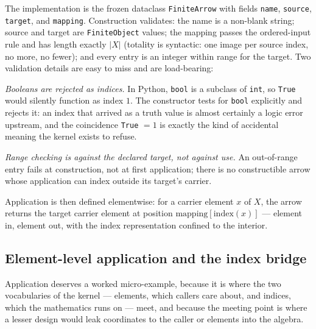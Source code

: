 The implementation is the frozen dataclass \texttt{FiniteArrow} with
fields \texttt{name}, \texttt{source}, \texttt{target}, and
\texttt{mapping}. Construction validates: the name is a non-blank string;
source and target are \texttt{FiniteObject} values; the mapping passes the
ordered-input rule and has length exactly $|X|$ (totality is syntactic:
one image per source index, no more, no fewer); and every entry is an
integer within range for the target. Two validation details are easy to
miss and are load-bearing:

\emph{Booleans are rejected as indices.} In Python, \texttt{bool} is a
subclass of \texttt{int}, so \texttt{True} would silently function as
index $1$. The constructor tests for \texttt{bool} explicitly and rejects
it: an index that arrived as a truth value is almost certainly a logic
error upstream, and the coincidence \texttt{True} $= 1$ is exactly the
kind of accidental meaning the kernel exists to refuse.

\emph{Range checking is against the declared target, not against use.} An
out-of-range entry fails at construction, not at first application; there
is no constructible arrow whose application can index outside its target's
carrier.

Application is then defined elementwise: for a carrier element $x$ of $X$,
the arrow returns the target carrier element at position
$\mathrm{mapping}[\mathrm{index}(x)]$ --- element in, element out, with
the index representation confined to the interior.

\subsection{Element-level application and the index bridge}

Application deserves a worked micro-example, because it is where the
two vocabularies of the kernel --- elements, which callers care about,
and indices, which the mathematics runs on --- meet, and because the
meeting point is where a lesser design would leak coordinates to the
caller or elements into the algebra.

